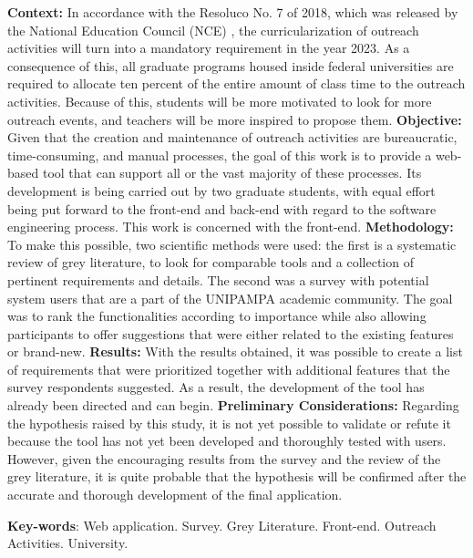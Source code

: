 \begin{resumo}[Abstract]
  \textbf{Context:} In accordance with the Resoluco No. 7 of 2018, which was released by the National Education Council (NCE) \cite{Resolucao-MEC:2018}, the curricularization of outreach activities will turn into a mandatory requirement in the year 2023. As a consequence of this, all graduate programs housed inside federal universities are required to allocate ten percent of the entire amount of class time to the outreach activities. Because of this, students will be more motivated to look for more outreach events, and teachers will be more inspired to propose them. \textbf{Objective:} Given that the creation and maintenance of outreach activities are bureaucratic, time-consuming, and manual processes, the goal of this work is to provide a web-based tool that can support all or the vast majority of these processes. Its development is being carried out by two graduate students, with equal effort being put forward to the front-end and back-end with regard to the software engineering process. This work is concerned with the front-end. \textbf{Methodology:} To make this possible, two scientific methods were used: the first is a systematic review of grey literature, to look for comparable tools and a collection of pertinent requirements and details. The second was a survey with potential system users that are a part of the UNIPAMPA academic community. The goal was to rank the functionalities according to importance while also allowing participants to offer suggestions that were either related to the existing features or brand-new. \textbf{Results:} With the results obtained, it was possible to create a list of requirements that were prioritized together with additional features that the survey respondents suggested. As a result, the development of the tool has already been directed and can begin. \textbf{Preliminary Considerations:} Regarding the hypothesis raised by this study, it is not yet possible to validate or refute it because the tool has not yet been developed and thoroughly tested with users. However, given the encouraging results from the survey and the review of the grey literature, it is quite probable that the hypothesis will be confirmed after the accurate and thorough development of the final application.

  \vspace{\onelineskip}

  \noindent
  \textbf{Key-words}: Web application. Survey. Grey Literature. Front-end. Outreach Activities. University.
\end{resumo}
